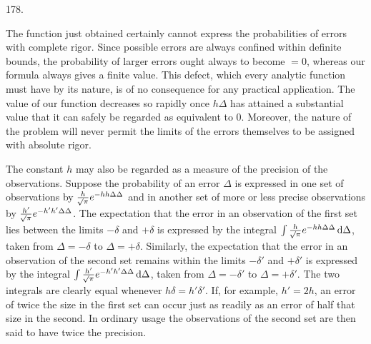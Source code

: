 \begin{center}\hypertarget{native-250-article178}{}178.\end{center}
The function just obtained certainly cannot express the probabilities of errors with complete rigor. Since possible errors are always confined within definite bounds, the probability of larger errors ought always to become $=0$, whereas our formula always gives a finite value. This defect, which every analytic function must have by its nature, is of no consequence for any practical application. The value of our function decreases so rapidly once $h\Delta$ has attained a substantial value that it can safely be regarded as equivalent to $0$. Moreover, the nature of the problem will never permit the limits of the errors themselves to be assigned with absolute rigor.

The constant $h$ may also be regarded as a measure of the precision of the observations. Suppose the probability of an error $\Delta$ is expressed in one set of observations by $\frac{h}{\mathord{{}^{}\!\surd}\pi}e^{-hh\Delta\Delta}$ and in another set of more or less precise observations by $\frac{h'}{\mathord{{}^{}\!\surd}\pi}e^{-h'h'\Delta\Delta}$. The expectation that the error in an observation of the first set lies between the limits $-\delta$ and $+\delta$ is expressed by the integral $\int\frac{h}{\mathord{{}^{}\!\surd}\pi}e^{-hh\Delta\Delta}\,\mathrm{d}\Delta$, taken from $\Delta=-\delta$ to $\Delta=+\delta$. Similarly, the expectation that the error in an observation of the second set remains within the limits $-\delta'$ and $+\delta'$ is expressed by the integral $\int\frac{h'}{\mathord{{}^{}\!\surd}\pi}e^{-h'h'\Delta\Delta}\,\mathrm{d}\Delta$, taken from $\Delta=-\delta'$ to $\Delta=+\delta'$. The two integrals are clearly equal whenever $h\delta=h'\delta'$. If, for example, $h'=2h$, an error of twice the size in the first set can occur just as readily as an error of half that size in the second. In ordinary usage the observations of the second set are then said to have twice the precision.
